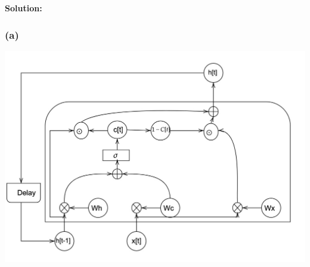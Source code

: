 \textbf{Solution:}
\subsubsection*{(a)}

\includegraphics[width=\linewidth]{./images/1-2a.png}






